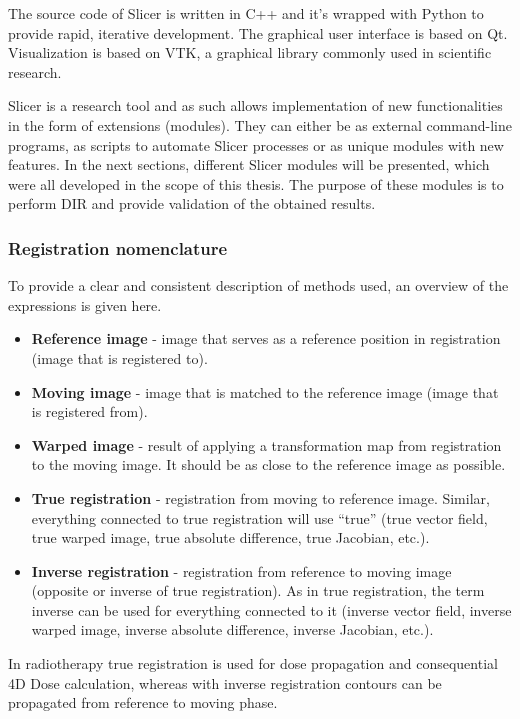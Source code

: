 \documentclass[type=dr, dr=rernat, accentcolor=tud7b,colorbacktitle, bigchapter, openright, twoside, 12pt ]{tudthesis}
\begin{document}
The source code of Slicer is written in C++ and it's wrapped with Python to provide rapid, iterative development. The graphical user interface is based on Qt. Visualization is based on VTK, a graphical library commonly
used in scientific research.

Slicer is a research tool and as such allows implementation of new functionalities in the form of extensions (modules). They can either be as external command-line programs, 
as scripts to automate Slicer processes or as unique modules with new features. In the next sections, different Slicer modules will be presented, which were all developed in the scope of this thesis. 
The purpose of these modules is to perform DIR and provide validation of the obtained results.

\subsubsection{Registration nomenclature}

To provide a clear and consistent description of methods used, an overview of the expressions is given here.

\begin{itemize}
 \item \textbf{Reference image} - image that serves as a reference position in registration (image that is registered to).
 \item \textbf{Moving image} - image that is matched to the reference image (image that is registered from).
 \item \textbf{Warped image} - result of applying a transformation map from registration to the moving image. It should be as close to the reference image as possible.
 \item \textbf{True registration} - registration from moving to reference image. Similar, everything connected to true registration will use ``true'' (true vector field, true warped image, true absolute difference, true Jacobian, etc.).
 \item \textbf{Inverse registration} - registration from reference to moving image (opposite or inverse of true registration). As in true registration, the term inverse can be used for everything connected to it (inverse vector field, inverse warped image, inverse absolute difference, inverse Jacobian, etc.).
\end{itemize}

In radiotherapy true registration is used for dose propagation and consequential 4D Dose calculation, whereas with inverse registration contours can be propagated from reference to moving phase.
\end{document}
